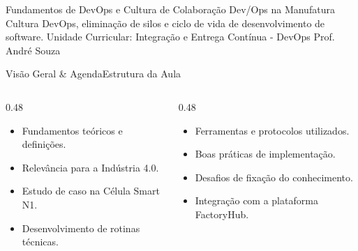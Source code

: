 
\senaicover
  {Fundamentos de DevOps e Cultura de Colaboração Dev/Ops na Manufatura}
  {Cultura DevOps, eliminação de silos e ciclo de vida de desenvolvimento de software.}
  {Unidade Curricular: Integração e Entrega Contínua - DevOps}
  {Prof. André Souza}

\begin{senaiframe}{Visão Geral \& Agenda}{Estrutura da Aula}
  \begin{columns}[t]
    \begin{column}{0.48\textwidth}
      \begin{tcolorbox}[senaibluecard, title={1. Conceitos Chave}]
        \begin{itemize}
          \item Fundamentos teóricos e definições.
          \item Relevância para a Indústria 4.0.
        \end{itemize}
      \end{tcolorbox}
      \vspace{4pt}
      \begin{tcolorbox}[senaiambercard, title={3. Aplicação Prática}]
        \begin{itemize}
          \item Estudo de caso na Célula Smart N1.
          \item Desenvolvimento de rotinas técnicas.
        \end{itemize}
      \end{tcolorbox}
    \end{column}
    \begin{column}{0.48\textwidth}
      \begin{tcolorbox}[senairedcard, title={2. Detalhamento Técnico}]
        \begin{itemize}
          \item Ferramentas e protocolos utilizados.
          \item Boas práticas de implementação.
        \end{itemize}
      \end{tcolorbox}
      \vspace{4pt}
      \begin{tcolorbox}[senaigreencard, title={4. Exercícios \& Avaliação}]
        \begin{itemize}
          \item Desafios de fixação do conhecimento.
          \item Integração com a plataforma FactoryHub.
        \end{itemize}
      \end{tcolorbox}
    \end{column}
  \end{columns}
\end{senaiframe}

